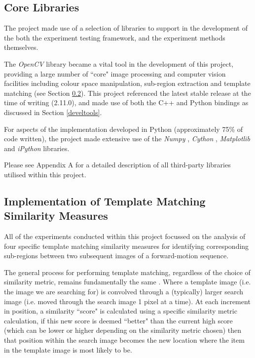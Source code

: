 \subsection{Core Libraries}
\label{libs}

The project made use of a selection of libraries to support in the development of the both the experiment testing framework, and the experiment methods themselves. 

The \textit{OpenCV} library \cite{opencv} became a vital tool in the development of this project, providing a large number of ``core" image processing and computer vision facilities including colour space manipulation, sub-region extraction and template matching (see Section \ref{templmatchopencv}). This project referenced the latest stable release at the time of writing (2.11.0), and made use of both the C++ and Python bindings as discussed in Section \ref{develtools}.

For aspects of the implementation developed in Python (approximately 75\% of code written), the project made extensive use of the \textit{Numpy} \cite{numpy}, \textit{Cython} \cite{cython}, \textit{Matplotlib} \cite{matplotlib} and \textit{iPython} \cite{ipython} libraries. 

Please see Appendix A for a detailed description of all third-party libraries utilised within this project.

\subsection{Implementation of Template Matching Similarity Measures}
\label{templmatchopencv}

All of the experiments conducted within this project focussed on the analysis of four specific template matching similarity measures for identifying corresponding sub-regions between two subsequent images of a forward-motion sequence.

The general process for performing template matching, regardless of the choice of similarity metric, remains fundamentally the same \cite{opencvtemplatematching}. Where a template image (i.e. the image we are searching for) is convolved through a (typically) larger search image (i.e. moved through the search image 1 pixel at a time). At each increment in position, a similarity ``score" is calculated using a specific similarity metric calculation, if this new score is deemed ``better" than the current high score (which can be lower or higher depending on the similarity metric chosen) then that position within the search image becomes the new location where the item in the template image is most likely to be.


